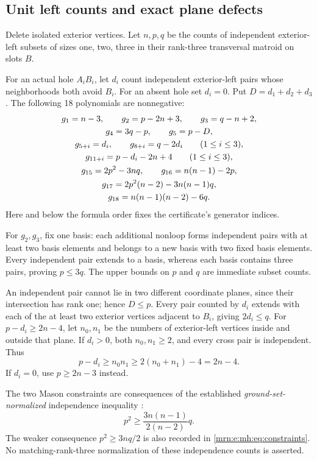 \documentclass[11pt,a4paper]{article}
\theoremstyle{remark}\newtheorem{remark}[theorem]{Remark}
\begin{document}
\subsection{Unit left counts and exact plane defects}
Delete isolated exterior vertices. Let $n,p,q$ be the counts of independent exterior-left subsets of sizes one, two, three in their rank-three transversal matroid on slots $B$.

For an actual hole $A_iB_i$, let $d_i$ count independent exterior-left pairs whose neighborhoods both avoid $B_i$. For an absent hole set $d_i=0$. Put $D=d_1+d_2+d_3$. The following 18 polynomials are nonnegative:
\begin{gather}
 g_1=n-3,\qquad g_2=p-2n+3,\qquad g_3=q-n+2,\notag\\
 g_4=3q-p,\qquad g_5=p-D,\label{mrn:e:mh:eq:constraints}\\
 g_{5+i}=d_i,\qquad g_{8+i}=q-2d_i\qquad(1\le i\le3),\notag\\
 g_{11+i}=p-d_i-2n+4\qquad(1\le i\le3),\notag\\
 g_{15}=2p^2-3nq,\qquad g_{16}=n(n-1)-2p,\notag\\
 g_{17}=2p^2(n-2)-3n(n-1)q,\notag\\
 g_{18}=n(n-1)(n-2)-6q.\notag
\end{gather}
Here and below the formula order fixes the certificate's generator indices.

For $g_2,g_3$, fix one basis: each additional nonloop forms independent pairs with at least two basis elements and belongs to a new basis with two fixed basis elements. Every independent pair extends to a basis, whereas each basis contains three pairs, proving $p\le3q$. The upper bounds on $p$ and $q$ are immediate subset counts.

An independent pair cannot lie in two different coordinate planes, since their intersection has rank one; hence $D\le p$. Every pair counted by $d_i$ extends with each of the at least two exterior vertices adjacent to $B_i$, giving $2d_i\le q$. For $p-d_i\ge2n-4$, let $n_0,n_1$ be the numbers of exterior-left vertices inside and outside that plane. If $d_i>0$, both $n_0,n_1\ge2$, and every cross pair is independent. Thus
\[
 p-d_i\ge n_0n_1\ge2(n_0+n_1)-4=2n-4.
\]
If $d_i=0$, use $p\ge2n-3$ instead.

The two Mason constraints are consequences of the established \emph{ground-set-normalized} independence inequality \cite[Theorem 4.14]{b:BH}:
\[
 p^2\ge\frac{3n(n-1)}{2(n-2)}q.
\]
The weaker consequence $p^2\ge3nq/2$ is also recorded in \eqref{mrn:e:mh:eq:constraints}. No matching-rank-three normalization of these independence counts is asserted.
\end{document}
